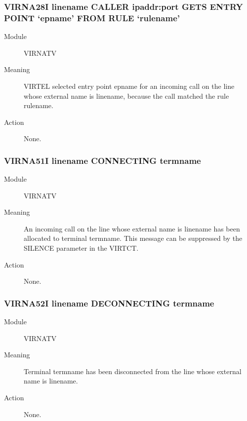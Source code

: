 \documentclass[letterpaper,10pt,english]{sphinxmanual}
\begin{document}
\subsubsection{VIRNA28I linename CALLER ipaddr:port GETS ENTRY POINT ‘epname’ FROM RULE ‘rulename’}
\label{\detokenize{messages:virna28i-linename-caller-ipaddr-port-gets-entry-point-epname-from-rule-rulename}}\begin{description}
\item[{Module}] \leavevmode
VIRNATV

\item[{Meaning}] \leavevmode
VIRTEL selected entry point epname for an incoming call on the line whose external name is linename, because the call matched the rule rulename.

\item[{Action}] \leavevmode
None.

\end{description}


\subsubsection{VIRNA51I linename CONNECTING termname}
\label{\detokenize{messages:virna51i-linename-connecting-termname}}\begin{description}
\item[{Module}] \leavevmode
VIRNATV

\item[{Meaning}] \leavevmode
An incoming call on the line whose external name is linename has been allocated to terminal termname. This message can be suppressed by the SILENCE parameter in the VIRTCT.

\item[{Action}] \leavevmode
None.

\end{description}


\subsubsection{VIRNA52I linename DECONNECTING termname}
\label{\detokenize{messages:virna52i-linename-deconnecting-termname}}\begin{description}
\item[{Module}] \leavevmode
VIRNATV

\item[{Meaning}] \leavevmode
Terminal termname has been disconnected from the line whose external name is linename.

\item[{Action}] \leavevmode
None.

\end{description}
\end{document}
